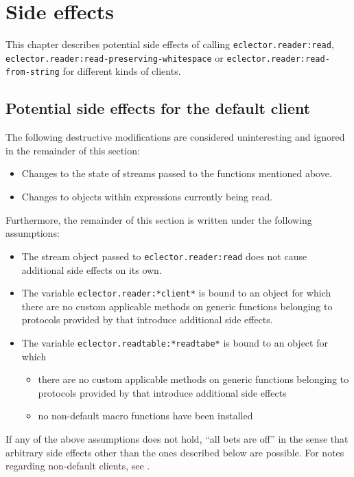 \chapter{Side effects}
\label{chap:side-effects}

This chapter describes potential side effects of calling
\texttt{eclector.reader:read},
\texttt{eclector.reader:read-preserving-whitespace} or
\texttt{eclector.reader:read-from-string} for different kinds of
clients.

\section{Potential side effects for the default client}
\label{sec:side-effects-default-client}

The following destructive modifications are considered uninteresting
and ignored in the remainder of this section:

\begin{itemize}
\item Changes to the state of streams passed to the functions
  mentioned above.
\item Changes to objects within expressions currently being read.
\end{itemize}

Furthermore, the remainder of this section is written under the
following assumptions:

\begin{itemize}
\item The stream object passed to \texttt{eclector.reader:read} does
  not cause additional side effects on its own.
\item The variable \texttt{eclector.reader:*client*} is bound to an
  object for which there are no custom applicable methods on generic
  functions belonging to protocols provided by \sysname{} that
  introduce additional side effects.
\item The variable \texttt{eclector.readtable:*readtabe*} is bound to
  an object for which
  \begin{itemize}
  \item there are no custom applicable methods on generic functions
    belonging to protocols provided by \sysname{} that introduce
    additional side effects
  \item no non-default macro functions have been installed
  \end{itemize}
\end{itemize}

If any of the above assumptions does not hold, ``all bets are off'' in
the sense that arbitrary side effects other than the ones described
below are possible.  For notes regarding non-default clients,
see .

